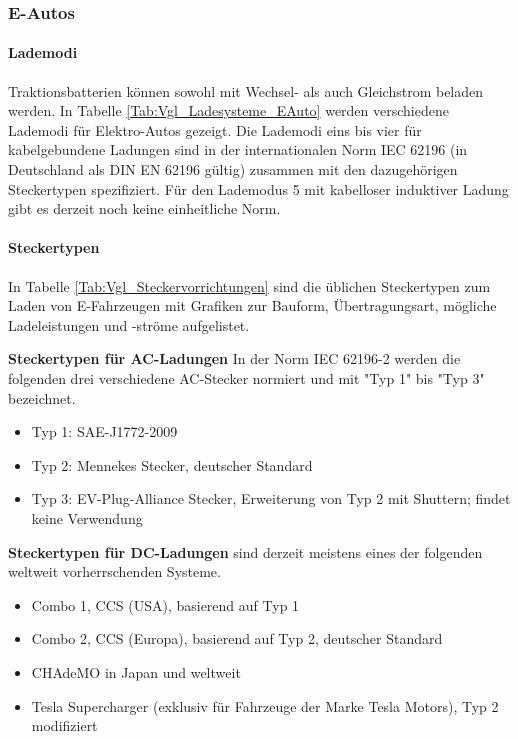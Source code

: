 		\subsubsection{E-Autos}
			\paragraph{Lademodi}
				Traktionsbatterien können sowohl mit Wechsel- als auch Gleichstrom beladen werden. In Tabelle \ref{Tab:Vgl_Ladesysteme_EAuto} werden verschiedene Lademodi für Elektro-Autos gezeigt. Die Lademodi eins bis vier für kabelgebundene Ladungen sind in der internationalen Norm IEC 62196 (in Deutschland als DIN EN 62196 gültig) zusammen mit den dazugehörigen Steckertypen spezifiziert. Für den Lademodus 5 mit kabelloser induktiver Ladung gibt es derzeit noch keine einheitliche Norm.


			\paragraph{Steckertypen}
				In Tabelle \ref{Tab:Vgl_Steckervorrichtungen} sind die üblichen Steckertypen zum Laden von E-Fahrzeugen mit Grafiken zur Bauform, Übertragungsart, mögliche Ladeleistungen und -ströme aufgelistet.
				
				\textbf{Steckertypen für AC-Ladungen} In der Norm IEC 62196-2 werden die folgenden drei verschiedene AC-Stecker normiert und mit "Typ 1" bis "Typ 3" bezeichnet. 
				
				\begin{itemize}
					\item Typ 1: SAE-J1772-2009
					\item Typ 2: Mennekes Stecker, deutscher Standard
					\item Typ 3: EV-Plug-Alliance Stecker, Erweiterung von Typ 2 mit Shuttern; findet keine Verwendung
				\end{itemize}
				
				\textbf{Steckertypen für DC-Ladungen} sind derzeit meistens eines der folgenden weltweit vorherrschenden Systeme.
				
				\begin{itemize}
					\item Combo 1, CCS (USA), basierend auf Typ 1
					\item Combo 2, CCS (Europa), basierend auf Typ 2, deutscher Standard
					\item CHAdeMO in Japan und weltweit \cite{IEC_CHAdeMO}
					\item Tesla Supercharger (exklusiv für Fahrzeuge der Marke Tesla Motors), Typ 2 modifiziert
				\end{itemize}
				
